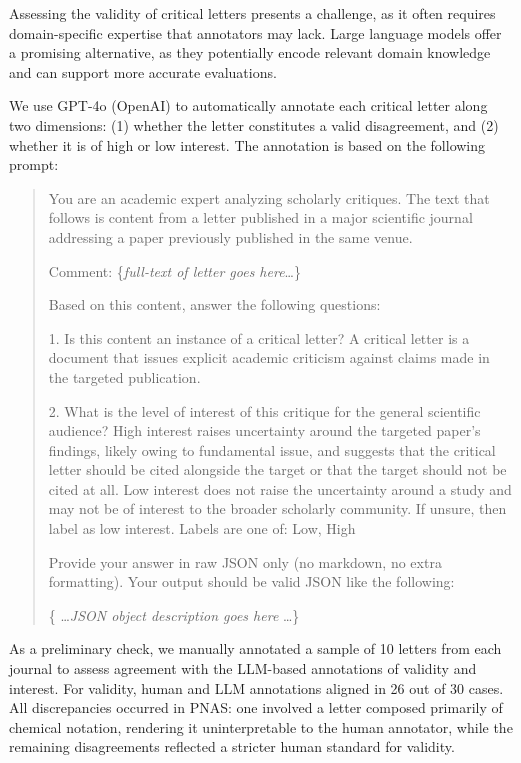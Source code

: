 \documentclass[12pt]{article} %
\begin{document}
Assessing the validity of critical letters presents a challenge, as it often requires domain-specific expertise that annotators may lack. Large language models offer a promising alternative, as they potentially encode relevant domain knowledge and can support more accurate evaluations.

We use GPT-4o (OpenAI) to automatically annotate each critical letter along two dimensions: (1) whether the letter constitutes a valid disagreement, and (2) whether it is of high or low interest. The annotation is based on the following prompt:

\begin{quote}
You are an academic expert analyzing scholarly critiques. The text that follows is content from a letter published in a major scientific journal addressing a paper previously published in the same venue.

Comment: \{\textit{full-text of letter goes here}\ldots\}

Based on this content, answer the following questions:

1. Is this content an instance of a critical letter? A critical letter is a document that issues explicit academic criticism against claims made in the targeted publication.

2. What is the level of interest of this critique for the general scientific audience? High interest raises uncertainty around the targeted paper's findings, likely owing to fundamental issue, and suggests that the critical letter should be cited alongside the target or that the target should not be cited at all. Low interest does not raise the uncertainty around a study and may not be of interest to the broader scholarly community. If unsure, then label as low interest. Labels are one of: Low, High

Provide your answer in raw JSON only (no markdown, no extra formatting). Your output should be valid JSON like the following:

\{ \ldots \textit{JSON object description goes here} \ldots\}
\end{quote}

As a preliminary check, we manually annotated a sample of 10 letters from each journal to assess agreement with the LLM-based annotations of validity and interest. For validity, human and LLM annotations aligned in 26 out of 30 cases. All discrepancies occurred in PNAS: one involved a letter composed primarily of chemical notation, rendering it uninterpretable to the human annotator, while the remaining disagreements reflected a stricter human standard for validity.
\end{document}
